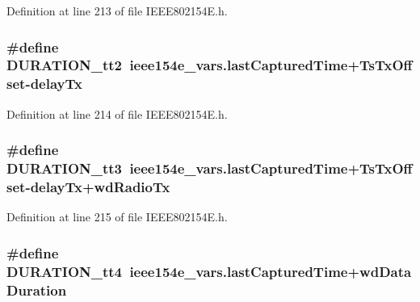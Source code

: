 Definition at line 213 of file I\+E\+E\+E802154\+E.\+h.

\subsubsection[{\texorpdfstring{D\+U\+R\+A\+T\+I\+O\+N\+\_\+tt2}{DURATION_tt2}}]{\setlength{\rightskip}{0pt plus 5cm}\#define D\+U\+R\+A\+T\+I\+O\+N\+\_\+tt2~ieee154e\+\_\+vars.\+last\+Captured\+Time+{\bf Ts\+Tx\+Offset}-\/{\bf delay\+Tx}}\hypertarget{group___i_e_e_e802154_e_ga20b6669d480984f3e8346a29ebe10b01}{}\label{group___i_e_e_e802154_e_ga20b6669d480984f3e8346a29ebe10b01}


Definition at line 214 of file I\+E\+E\+E802154\+E.\+h.

\subsubsection[{\texorpdfstring{D\+U\+R\+A\+T\+I\+O\+N\+\_\+tt3}{DURATION_tt3}}]{\setlength{\rightskip}{0pt plus 5cm}\#define D\+U\+R\+A\+T\+I\+O\+N\+\_\+tt3~ieee154e\+\_\+vars.\+last\+Captured\+Time+{\bf Ts\+Tx\+Offset}-\/{\bf delay\+Tx}+{\bf wd\+Radio\+Tx}}\hypertarget{group___i_e_e_e802154_e_ga0bdb54236277f59ed22a8151088c2916}{}\label{group___i_e_e_e802154_e_ga0bdb54236277f59ed22a8151088c2916}


Definition at line 215 of file I\+E\+E\+E802154\+E.\+h.

\subsubsection[{\texorpdfstring{D\+U\+R\+A\+T\+I\+O\+N\+\_\+tt4}{DURATION_tt4}}]{\setlength{\rightskip}{0pt plus 5cm}\#define D\+U\+R\+A\+T\+I\+O\+N\+\_\+tt4~ieee154e\+\_\+vars.\+last\+Captured\+Time+{\bf wd\+Data\+Duration}}\hypertarget{group___i_e_e_e802154_e_gad841906d2fd241f97b25ffc74df1bc4f}{}\label{group___i_e_e_e802154_e_gad841906d2fd241f97b25ffc74df1bc4f}


